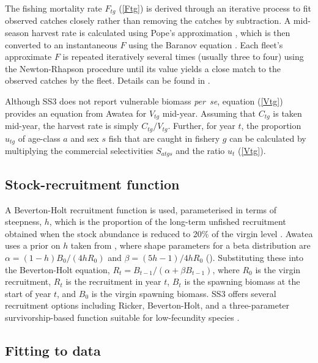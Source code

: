 \documentclass[11pt]{book}
\newcommand{\pc}{\%}
\newcommand{\eref}[1]{(\ref{#1})}
\begin{document}
The fishing mortality rate $F_{tg}$ \eref{Ftg} is derived through an iterative process to fit observed catches closely rather than removing the catches by subtraction.
A mid-season harvest rate is calculated using Pope's approximation \citep{Pope:1972}, which is then converted to an instantaneous $F$ using the Baranov equation \citep{Baranov:1918}.
Each fleet's approximate $F$ is repeated iteratively several times (usually three to four) using the Newton-Rhapson procedure until its value yields a close match to the observed catches by the fleet.
Details can be found in \citet{Methot-Wetzel:2013}.

Although SS3 does not report vulnerable biomass \textit{per~se}, equation \eref{Vtg} provides an equation from Awatea for $V_{tg}$ mid-year.
Assuming that $C_{tg}$ is taken mid-year, the harvest rate is simply $C_{tg} / V_{tg}$.
Further, for year $t$, the proportion $u_{tg}$ of age-class $a$ and sex $s$ fish that are caught in fishery $g$ can be calculated by multiplying the commercial selectivities $S_{atgs}$ and the ratio $u_t$ \eref{Vtg}.

\subsection{Stock-recruitment function}

A Beverton-Holt recruitment function is used, parameterised in terms of steepness, $h$, which is the proportion of the long-term unfished recruitment obtained when the stock abundance is reduced to 20\pc{} of the virgin level \citep{Mace-Doonan:1988, Michielsens-McAllister:2004}.
Awatea uses a prior on $h$ taken from \citet{Forrest-etal:2010}, where shape parameters for a beta distribution are $\alpha = (1 - h) B_0 / (4 h R_0)$ and $\beta = (5 h - 1) / 4 h R_0$ (\citealt{Hilborn-etal:2003, Michielsens-McAllister:2004}). 
Substituting these into the Beverton-Holt equation, $R_t = B_{t-1} / (\alpha + \beta B_{t-1})$, where $R_0$ is the virgin recruitment, $R_t$ is the recruitment in year $t$, $B_t$ is the spawning biomass at the start of year $t$, and $B_0$ is the virgin spawning biomass.
SS3 offers several recruitment options including Ricker, Beverton-Holt, and a three-parameter survivorship-based function suitable for low-fecundity species \citep{Taylor-etal:2013}.

\subsection{Fitting to data}
\end{document}
